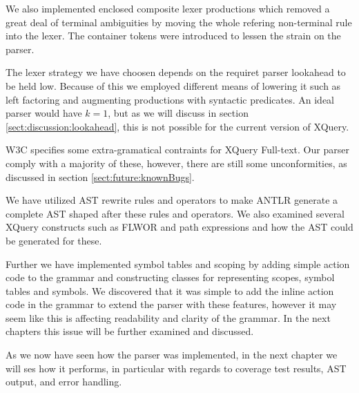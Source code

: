 We also implemented enclosed composite lexer productions which removed a great
deal of terminal ambiguities by moving the whole refering non-terminal rule
into the lexer. The container tokens were introduced to lessen the strain on
the parser.

The lexer strategy we have choosen depends on the requiret parser lookahead to
be held low. Because of this we employed different means of lowering it such as
left factoring and augmenting productions with syntactic predicates. An ideal
parser would have $k=1$, but as we will discuss in section
\ref{sect:discussion:lookahead}, this is not possible for the current version
of XQuery.

W3C specifies some extra-gramatical contraints for XQuery Full-text. Our parser
comply with a majority of these, however, there are still some
unconformities, as discussed in section \ref{sect:future:knownBugs}.  

We have utilized AST rewrite rules and operators to make
ANTLR generate a complete AST shaped after these rules and operators. We also
examined several XQuery constructs such as FLWOR and path expressions and how
the AST could be generated for these.

Further we have implemented symbol tables and scoping by adding simple action
code to the grammar and constructing classes for representing scopes, symbol
tables and symbols. We discovered that it was simple to add the inline action 
code in the grammar to extend the parser with these features, however it may
seem like this is affecting readability and clarity of the grammar. In the next
chapters this issue will be further examined and discussed.

As we now have seen how the parser was implemented, in the next chapter we will
ses how it performs, in particular with regards to coverage test results, AST
output, and error handling.